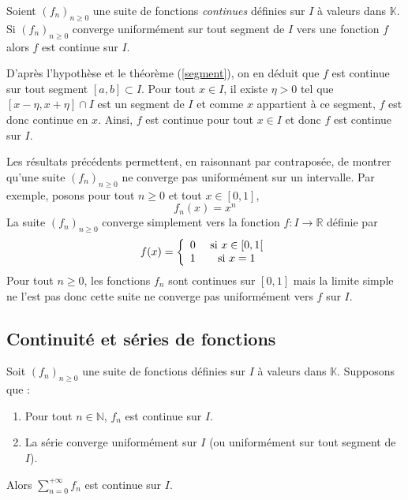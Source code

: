 \documentclass[french,11pt,twoside]{VcCours}
\begin{document}
\begin{Proposition}{} Soient $(f_n)_{n \geq 0}$ une suite de fonctions \emph{continues} définies sur $I$ à valeurs dans $\mathbb{K}$. Si $(f_n)_{n \geq 0}$ converge uniformément sur tout segment de $I$ vers une fonction $f$ alors $f$ est continue sur $I$.
\end{Proposition}

\begin{Demonstration}{} D'après l'hypothèse et le théorème (\ref{segment}), on en déduit que $f$ est continue sur tout segment $[a,b] \subset I$. Pour tout $x \in I$, il existe $\eta>0$ tel que $[x- \eta, x+ \eta] \cap I$ est un segment de $I$ et comme $x$ appartient à ce segment, $f$ est donc continue en $x$. Ainsi, $f$ est continue pour tout $x \in I$ et donc $f$ est continue sur $I$.
\end{Demonstration}

\medskip



\begin{Remarque}{} Les résultats précédents permettent, en raisonnant par contraposée, de montrer qu'une suite $(f_n)_{n \geq 0}$ ne converge pas uniformément sur un intervalle. Par exemple, posons pour tout $n \geq 0$ et tout $x \in [0,1]$,
$$ f_n(x) = x^n $$
La suite $(f_n)_{n \geq 0}$ converge simplement vers la fonction $f : I \rightarrow \mathbb{R}$ définie par 
$$  f(x) = \left\lbrace \begin{array}{ccl}
0 & \hbox{ si } x \in [0,1[ \\
1 & \hbox{ si } x =1 \\
\end{array}\right. $$
Pour tout $n \geq 0$, les fonctions $f_n$ sont continues sur $[0,1]$ mais la limite simple ne l'est pas donc cette suite ne converge pas uniformément vers $f$ sur $I$.
\end{Remarque}

\subsection{Continuité et séries de fonctions}

\begin{Theoreme}{} Soit $(f_n)_{n \geq 0}$ une suite de fonctions définies sur $I$ à valeurs dans $\mathbb{K}$. Supposons que :

\begin{enumerate}
\item Pour tout $n \in \mathbb{N}$, $f_n$ est continue sur $I$.
\item La série converge uniformément sur $I$ (ou uniformément sur tout segment de $I$).
\end{enumerate}
Alors $\sum_{n  =0}^{+ \infty} f_n$ est continue sur $I$.
\end{Theoreme}
\end{document}

